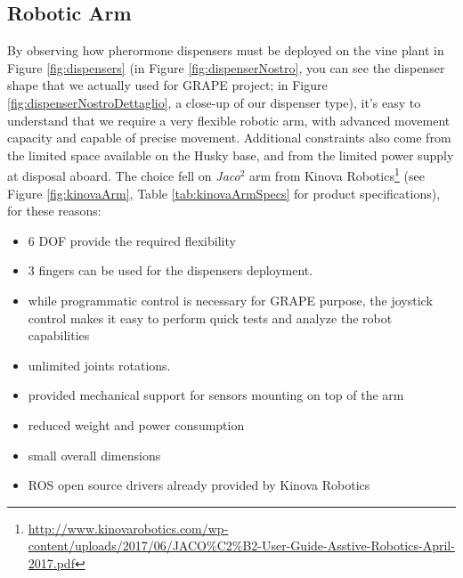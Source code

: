 \subsection{Robotic Arm}\label{subsec:kinovaArm}
By observing how pherormone dispensers must be deployed on the vine plant in Figure \ref{fig:dispensers} (in Figure \ref{fig:dispenserNostro}, you can see the dispenser shape that we actually used for \ac{GRAPE} project; in Figure \ref{fig:dispenserNostroDettaglio}, a close-up of our dispenser type), it's easy to understand that we require a very flexible robotic arm, with advanced movement capacity and capable of precise movement. Additional constraints also come from the limited space available on the Husky base, and from the limited power supply at disposal aboard. The choice fell on \textit{Jaco$^2$} arm from Kinova Robotics\footnote{\url{http://www.kinovarobotics.com/wp-content/uploads/2017/06/JACO\%C2\%B2-User-Guide-Asstive-Robotics-April-2017.pdf}}
(see Figure \ref{fig:kinovaArm}, Table \ref{tab:kinovaArmSpecs} for product specifications), for these reasons:
\begin{itemize}
	\item 6 DOF provide the required flexibility
	\item 3 fingers can be used for the dispensers deployment.
	\item while programmatic control is necessary for \ac{GRAPE} purpose, the joystick control makes it easy to perform quick tests and analyze the robot capabilities
	\item unlimited joints rotations.
	\item provided mechanical support for sensors mounting on top of the arm
	\item reduced weight and power consumption
	\item small overall dimensions
	\item \ac{ROS} open source drivers already provided by Kinova Robotics
\end{itemize}


